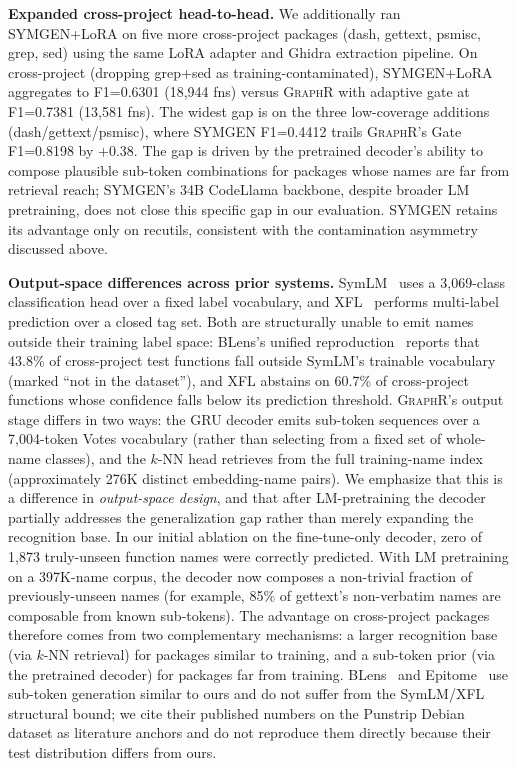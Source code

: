 \documentclass[sigconf,nonacm]{acmart}
\newcommand{\sysname}{\textsc{GraphR}}
\begin{document}
\textbf{Expanded cross-project head-to-head.} We additionally ran SYMGEN+LoRA on five more cross-project packages (dash, gettext, psmisc, grep, sed) using the same LoRA adapter and Ghidra extraction pipeline. On cross-project (dropping grep+sed as training-contaminated), SYMGEN+LoRA aggregates to F1=0.6301 (18{,}944 fns) versus \sysname{} with adaptive gate at F1=0.7381 (13{,}581 fns). The widest gap is on the three low-coverage additions (dash/gettext/psmisc), where SYMGEN F1=0.4412 trails \sysname{}'s Gate F1=0.8198 by $+0.38$. The gap is driven by the pretrained decoder's ability to compose plausible sub-token combinations for packages whose names are far from retrieval reach; SYMGEN's 34B CodeLlama backbone, despite broader LM pretraining, does not close this specific gap in our evaluation. SYMGEN retains its advantage only on recutils, consistent with the contamination asymmetry discussed above.

\textbf{Output-space differences across prior systems.} SymLM~\cite{symlm} uses a 3{,}069-class classification head over a fixed label vocabulary, and XFL~\cite{xfl} performs multi-label prediction over a closed tag set. Both are structurally unable to emit names outside their training label space: BLens's unified reproduction~\cite{blens} reports that 43.8\% of cross-project test functions fall outside SymLM's trainable vocabulary (marked ``not in the dataset''), and XFL abstains on 60.7\% of cross-project functions whose confidence falls below its prediction threshold. \sysname{}'s output stage differs in two ways: the GRU decoder emits sub-token sequences over a 7{,}004-token Votes vocabulary (rather than selecting from a fixed set of whole-name classes), and the $k$-NN head retrieves from the full training-name index (approximately 276K distinct embedding-name pairs). We emphasize that this is a difference in \emph{output-space design}, and that after LM-pretraining the decoder partially addresses the generalization gap rather than merely expanding the recognition base. In our initial ablation on the fine-tune-only decoder, zero of 1{,}873 truly-unseen function names were correctly predicted. With LM pretraining on a 397K-name corpus, the decoder now composes a non-trivial fraction of previously-unseen names (for example, 85\% of gettext's non-verbatim names are composable from known sub-tokens). The advantage on cross-project packages therefore comes from two complementary mechanisms: a larger recognition base (via $k$-NN retrieval) for packages similar to training, and a sub-token prior (via the pretrained decoder) for packages far from training. BLens~\cite{blens} and Epitome~\cite{epitome} use sub-token generation similar to ours and do not suffer from the SymLM/XFL structural bound; we cite their published numbers on the Punstrip Debian dataset as literature anchors and do not reproduce them directly because their test distribution differs from ours.
\end{document}
